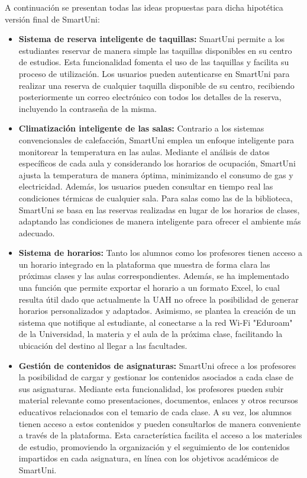 \documentclass[12pt]{report}
\begin{document}
A continuación se presentan todas las ideas propuestas para dicha hipotética versión final de SmartUni:
\\
\begin{itemize}

\item \textbf{Sistema de reserva inteligente de taquillas:} SmartUni permite a los estudiantes reservar de manera simple las taquillas disponibles en su centro de estudios. Esta funcionalidad fomenta el uso de las taquillas y facilita su proceso de utilización. Los usuarios pueden autenticarse en SmartUni para realizar una reserva de cualquier taquilla disponible de su centro, recibiendo posteriormente un correo electrónico con todos los detalles de la reserva, incluyendo la contraseña de la misma.

\item \textbf{Climatización inteligente de las salas:} Contrario a los sistemas convencionales de calefacción, SmartUni emplea un enfoque inteligente para monitorear la temperatura en las aulas. Mediante el análisis de datos específicos de cada aula y considerando los horarios de ocupación, SmartUni ajusta la temperatura de manera óptima, minimizando el consumo de gas y electricidad. Además, los usuarios pueden consultar en tiempo real las condiciones térmicas de cualquier sala.
Para salas como las de la biblioteca, SmartUni se basa en las reservas realizadas en lugar de los horarios de clases, adaptando las condiciones de manera inteligente para ofrecer el ambiente más adecuado.
\item \textbf{Sistema de horarios:} Tanto los alumnos como los profesores tienen acceso a un horario integrado en la plataforma que muestra de forma clara las próximas clases y las aulas correspondientes. Además, se ha implementado una función que permite exportar el horario a un formato Excel, lo cual resulta útil dado que actualmente la UAH no ofrece la posibilidad de generar horarios personalizados y adaptados. Asimismo, se plantea la creación de un sistema que notifique al estudiante, al conectarse a la red Wi-Fi "Eduroam" de la Universidad, la materia y el aula de la próxima clase, facilitando la ubicación del destino al llegar a las facultades.

\item \textbf{Gestión de contenidos de asignaturas:} SmartUni ofrece a los profesores la posibilidad de cargar y gestionar los contenidos asociados a cada clase de sus asignaturas. Mediante esta funcionalidad, los profesores pueden subir material relevante como presentaciones, documentos, enlaces y otros recursos educativos relacionados con el temario de cada clase. A su vez, los alumnos tienen acceso a estos contenidos y pueden consultarlos de manera conveniente a través de la plataforma. Esta característica facilita el acceso a los materiales de estudio, promoviendo la organización y el seguimiento de los contenidos impartidos en cada asignatura, en línea con los objetivos académicos de SmartUni.


\end{itemize}
\end{document}
